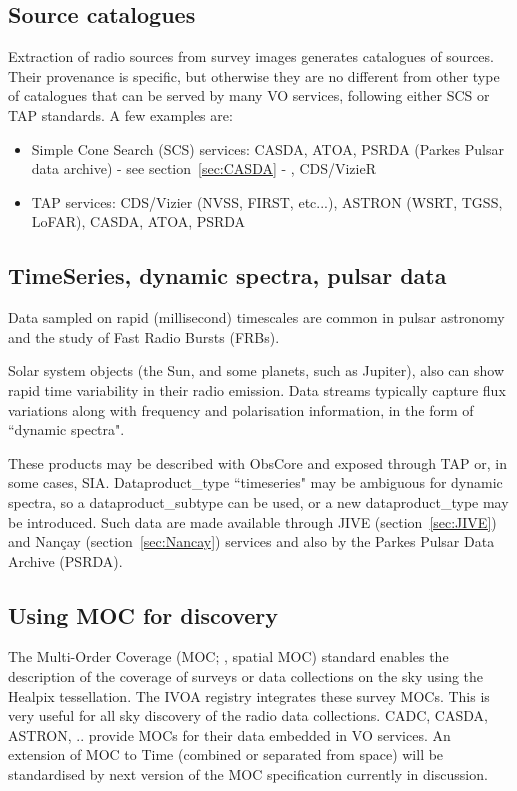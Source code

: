 \documentclass[11pt,a4paper]{ivoa}
\begin{document}
\subsection{Source catalogues}
Extraction of radio sources from survey images generates catalogues of sources. Their provenance is 
specific, but otherwise they are no different from other type of catalogues that can be served by many 
VO services, following either SCS \citep{std:SCS} or TAP standards. A few examples are:
\begin{itemize}
\item Simple Cone Search (SCS) services: CASDA, ATOA, PSRDA (Parkes Pulsar data archive) - see 
section~\ref{sec:CASDA} - , CDS/VizieR
\item TAP services: CDS/Vizier (NVSS, FIRST, etc...), ASTRON (WSRT, TGSS, LoFAR), CASDA, ATOA, PSRDA 
\end{itemize}


\subsection{TimeSeries, dynamic spectra, pulsar data}

Data sampled on rapid (millisecond) timescales are common in pulsar astronomy and the study of Fast 
Radio Bursts (FRBs). 

Solar system objects (the Sun, and some planets, such as Jupiter), also can show 
rapid time variability in their radio emission. Data streams typically capture flux variations along 
with frequency and polarisation information, in the form of ``dynamic spectra".

These products may be described with ObsCore and exposed through TAP or, in some cases, SIA. 
Dataproduct\_type ``timeseries" may be ambiguous for dynamic spectra, so a dataproduct\_subtype can be 
used, or a new dataproduct\_type may be introduced. Such data are made available through JIVE 
(section~\ref{sec:JIVE}) and Nan\c cay (section~\ref{sec:Nancay}) services and also by the Parkes Pulsar 
Data Archive (PSRDA).

\subsection{Using MOC for discovery}

The Multi-Order Coverage (MOC; \cite{2019ivoa.spec.1007F}, spatial MOC) standard enables the description 
of the coverage of surveys or data collections on the sky using the Healpix tessellation. The IVOA 
registry integrates these survey MOCs. This is very useful for all sky discovery of the radio data 
collections. CADC, CASDA, ASTRON, .. provide MOCs for their data embedded in VO services. An extension 
of MOC to Time (combined or separated from space) will be standardised by next version of the MOC 
specification currently in discussion.
\end{document}
